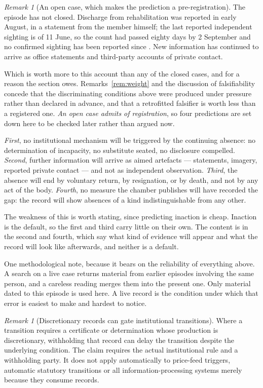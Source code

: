 \documentclass[11pt,a4paper]{article}
\theoremstyle{remark}
\newtheorem{remark}[definition]{Remark}
\begin{document}
\begin{remark}[An open case, which makes the prediction a pre-registration]\label{rem:open}
The episode has not closed. Discharge from rehabilitation was reported in early August, in a
statement from the member himself; the last reported independent sighting is of 11 June, so the count
had passed eighty days by 2 September and no confirmed sighting has been reported since
\citep{unseen2026}. New information has continued to arrive as office
statements and third-party accounts of private contact.

Which is worth more to this account than any of the closed cases, and for a reason the section
owes. Remarks~\ref{rem:weight} and the discussion of falsifiability concede that the discriminating
conditions above were produced under pressure rather than declared in advance, and that a retrofitted
falsifier is worth less than a registered one. \emph{An open case admits of registration}, so four
predictions are set down here to be checked later rather than argued now.

\emph{First}, no institutional mechanism will be triggered by the continuing absence: no determination
of incapacity, no substitute seated, no disclosure compelled. \emph{Second}, further information will
arrive as aimed artefacts --- statements, imagery, reported private contact --- and not as independent
observation. \emph{Third}, the absence will end by voluntary return, by resignation, or by death, and
not by any act of the body. \emph{Fourth}, no measure the chamber publishes will have recorded the gap:
the record will show absences of a kind indistinguishable from any other.

The weakness of this is worth stating, since predicting inaction is cheap. Inaction is the
default, so the first and third carry little on their own. The content is in the second and
fourth, which say what kind of evidence will appear and what the record will look like afterwards, and
neither is a default.

One methodological note, because it bears on the reliability of everything above. A search on a
live case returns material from earlier episodes involving the same person, and a careless reading
merges them into the present one. Only material dated to this episode is used here. A live record
is the condition under which that error is easiest to make and hardest to notice.
\end{remark}

\begin{remark}[Discretionary records can gate institutional transitions]\label{prop:documents-not-states}
Where a transition requires a certificate or determination whose production
is discretionary, withholding that record can delay the transition despite
the underlying condition. The claim requires the actual institutional rule
and a withholding party. It does not apply automatically to price-feed
triggers, automatic statutory transitions or all information-processing
systems merely because they consume records.
\end{remark}
\end{document}
